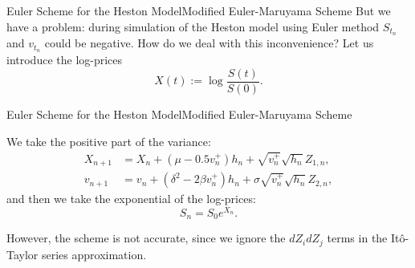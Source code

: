 \begin{frame}{Euler Scheme for the Heston Model}{Modified Euler-Maruyama Scheme}
    But we have a problem: during simulation of the Heston model using Euler method $S_{t_n}$ and $v_{t_n}$ could be negative. How do we deal with this inconvenience?
    Let us introduce the log-prices
    \begin{equation}
        X(t) := \log\frac{S(t)}{S(0)}.
    \end{equation}
\end{frame}

\begin{frame}{Euler Scheme for the Heston Model}{Modified Euler-Maruyama Scheme}
    
    We take the positive part of the variance:
    \begin{align}
        X_{n+1} & = X_n + (\mu - 0.5 v_n^+)h_n + \sqrt{v_n^+} \sqrt{h_n} Z_{1,n}, \label{Euler:Heston:price:posmod}\\
        v_{n+1} & = v_n + \left(\delta^2 - 2\beta v_n^+\right) h_n + \sigma \sqrt{v_n^+} \sqrt{h_n} Z_{2,n}, \label{Euler:Heston:variance:posmod}
    \end{align}
    and then we take the exponential of the log-prices:
    \begin{equation}
        S_{n} = S_0 e^{X_{n}}.
    \end{equation}
    
    However, the scheme is not accurate, since we ignore the $dZ_idZ_j$ terms in the It\^o-Taylor series approximation.
\end{frame}